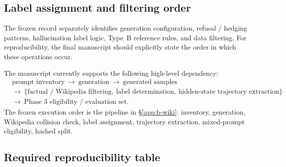 \documentclass{article}
\begin{document}
\subsection{Label assignment and filtering order}
\label{app:b-order}

The frozen record separately identifies generation configuration, refusal / hedging patterns, hallucination label logic, Type~B reference rules, and data filtering.
For reproducibility, the final manuscript should explicitly state the order in which these operations occur.

The manuscript currently supports the following high-level dependency:
\begin{equation}
\begin{aligned}
&\text{prompt inventory}
\ \rightarrow\
\text{generation}
\ \rightarrow\
\text{generated samples}\\
&\rightarrow\
\{\text{factual / {Wikipedia} filtering},\
\text{label determination},\
\text{hidden-state trajectory extraction}\}\\
&\rightarrow\
\text{Phase~3 eligibility / evaluation set}.
\end{aligned}
\end{equation}
The frozen execution order is the pipeline in \S\ref{app:b-wiki}: inventory, generation, Wikipedia collision check, label assignment, trajectory extraction, mixed-prompt eligibility, hashed split.

\subsection{Required reproducibility table}
\label{app:b-repro-tab}
\end{document}

